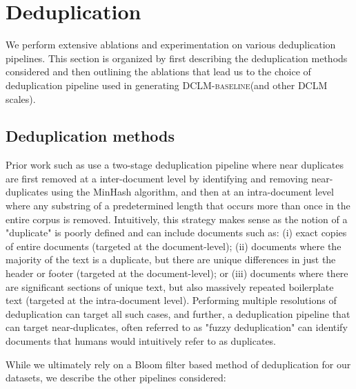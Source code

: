 \documentclass{article}
\newcommand{\dclm}{\textsc{DCLM}\xspace}
\newcommand{\hqpool}{\textsc{DCLM-baseline}\xspace}
\begin{document}
\section{Deduplication}\label{appx:dedup}
We perform extensive ablations and experimentation on various deduplication pipelines. This section is organized by first describing the deduplication methods considered and then outlining the ablations that lead us to the choice of deduplication pipeline used in generating \hqpool (and other \dclm scales).

\subsection{Deduplication methods}
Prior work such as \citet{Lee2021DeduplicatingTD, refinedweb} use a two-stage deduplication pipeline where near duplicates are first removed at a inter-document level by identifying and removing near-duplicates using the MinHash algorithm, and then at an intra-document level where any substring of a predetermined length that occurs more than once in the entire corpus is removed. Intuitively, this strategy makes sense as the notion of a "duplicate" is poorly defined and can include documents such as: (i) exact copies of entire documents (targeted at the document-level); (ii) documents where the majority of the text is a duplicate, but there are unique differences in just the header or footer (targeted at the document-level); or (iii) documents where there are significant sections of unique text, but also massively repeated boilerplate text (targeted at the intra-document level). Performing multiple resolutions of deduplication can target all such cases, and further, a deduplication pipeline that can target near-duplicates, often referred to as "fuzzy deduplication" can identify documents that humans would intuitively refer to as duplicates.

While we ultimately rely on a Bloom filter based method of deduplication for our datasets, we describe the other pipelines considered:
\end{document}
